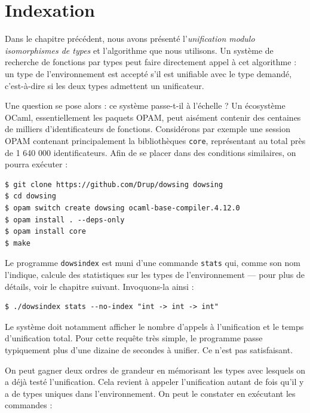 \documentclass[a4paper]{report}
\theoremstyle{definition}
\newcommand{\dowsindex}{\texttt{dowsindex}\xspace}
\begin{document}

\chapter {Indexation}

Dans le chapitre précédent, nous avons présenté l'\emph{unification modulo isomorphismes de types} et l'algorithme que nous utilisons. Un système de recherche de fonctions par types peut faire directement appel à cet algorithme : un type de l'environnement est accepté s'il est unifiable avec le type demandé, c'est-à-dire si les deux types admettent un unificateur.

Une question se pose alors : ce système passe-t-il à l'échelle ? Un écosystème OCaml, essentiellement les paquets OPAM, peut aisément contenir des centaines de milliers d'identificateurs de fonctions. Considérons par exemple une session OPAM contenant principalement la bibliothèques \texttt{core}, représentant au total près de 1 640 000 identificateurs. Afin de se placer dans des conditions similaires, on pourra exécuter :

\begin{verbatim}
$ git clone https://github.com/Drup/dowsing dowsing
$ cd dowsing
$ opam switch create dowsing ocaml-base-compiler.4.12.0
$ opam install . --deps-only
$ opam install core
$ make
\end{verbatim}

Le programme \dowsindex est muni d'une commande \texttt{stats} qui, comme son nom l'indique, calcule des statistiques sur les types de l'environnement — pour plus de détails, voir le chapitre suivant. Invoquons-la ainsi :

\begin{verbatim}
$ ./dowsindex stats --no-index "int -> int -> int"
\end{verbatim}

Le système doit notamment afficher le nombre d'appels à l'unification et le temps d'unification total. Pour cette requête très simple, le programme passe typiquement plus d'une dizaine de secondes à unifier. Ce n'est pas satisfaisant.

On peut gagner deux ordres de grandeur en mémorisant les types avec lesquels on a déjà testé l'unification. Cela revient à appeler l'unification autant de fois qu'il y a de types uniques dans l'environnement. On peut le constater en exécutant les commandes :
\end{document}
